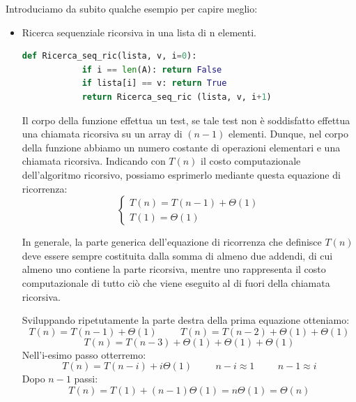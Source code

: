 Introduciamo da subito qualche esempio per capire meglio:
\begin{example}\phantom{}
    \begin{itemize}
        \item Ricerca sequenziale ricorsiva in una lista di n elementi.
        
        \begin{lstlisting}[language=Python]
        def Ricerca_seq_ric(lista, v, i=0):
            if i == len(A): return False
            if lista[i] == v: return True
            return Ricerca_seq_ric (lista, v, i+1)
        \end{lstlisting}
        
        
        Il corpo della funzione effettua un test, se tale test non è soddisfatto effettua una chiamata ricorsiva su un array di $(n-1)$ elementi. Dunque, nel corpo della funzione abbiamo un numero costante di operazioni elementari e una chiamata ricorsiva. Indicando con $T(n)$ il costo computazionale dell'algoritmo ricorsivo, possiamo esprimerlo mediante questa equazione di ricorrenza:
        $$\begin{cases}T(n)=T(n-1)+\Theta(1)\\T(1)=\Theta(1)\end{cases}$$
        
        In generale, la parte generica dell'equazione di ricorrenza che definisce $T(n)$ deve essere sempre costituita dalla somma di almeno due addendi, di cui almeno uno contiene la parte ricorsiva, mentre uno rappresenta il costo computazionale di tutto ciò che viene eseguito al di fuori della chiamata ricorsiva.
        
        Sviluppando ripetutamente la parte destra della prima equazione otteniamo:
        \begin{equation*}T(n) = T(n-1) + \Theta(1)\hspace{1cm} T(n) = T(n - 2) + \Theta(1) + \Theta(1)\end{equation*}
        \begin{equation*}T(n) = T(n-3) + \Theta(1) + \Theta(1) + \Theta(1)\end{equation*}
        Nell'i-esimo passo otterremo:
        \begin{equation*}T(n)=T(n-i)+i\Theta(1)\hspace{1cm}n-i\approx 1\hspace{1cm} n-1\approx i\end{equation*}
        Dopo $n-1$ passi:
        \begin{equation*}T(n) = T(1)+(n-1)\Theta(1) = n\Theta(1) = \Theta(n)\end{equation*}
        

\end{itemize}
\end{example}
